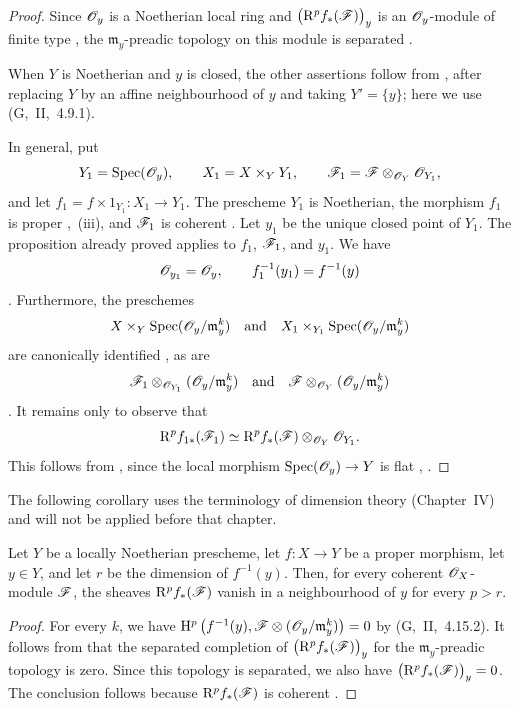 \begin{proof}
Since $\mathscr{O}_y$ is a Noetherian local ring and
$\bigl(\mathrm{R}^p f_*(\mathscr{F})\bigr)_y$ is an $\mathscr{O}_y$-module of finite
type , the $\mathfrak{m}_y$-preadic topology on this
module is separated .

When $Y$ is Noetherian and $y$ is closed, the other assertions follow
from , after replacing $Y$ by an affine neighbourhood
of $y$ and taking $Y'=\{y\}$; here we use (G,~II,~4.9.1).

In general, put
\[
  Y_1=\operatorname{Spec}(\mathscr{O}_y),
  \qquad
  X_1=X\times_Y Y_1,
  \qquad
  \mathscr{F}_1
  =
  \mathscr{F}\otimes_{\mathscr{O}_Y}\mathscr{O}_{Y_1},
\]
and let $f_1=f\times 1_{Y_1}:X_1\longrightarrow Y_1$.
The prescheme $Y_1$ is Noetherian, the morphism $f_1$ is proper
,~(iii), and $\mathscr{F}_1$ is coherent
.
Let $y_1$ be the unique closed point of $Y_1$.
The proposition already proved applies to $f_1$, $\mathscr{F}_1$, and
$y_1$.
We have
\[
  \mathscr{O}_{y_1}=\mathscr{O}_y,
  \qquad
  f_1^{-1}(y_1)=f^{-1}(y)
\]
.
Furthermore, the preschemes
\[
  X\times_Y\operatorname{Spec}(\mathscr{O}_y/\mathfrak{m}_y^k)
  \quad\text{and}\quad
  X_1\times_{Y_1}\operatorname{Spec}(\mathscr{O}_y/\mathfrak{m}_y^k)
\]
are canonically identified , as are
\[
  \mathscr{F}_1
  \otimes_{\mathscr{O}_{Y_1}}
  (\mathscr{O}_y/\mathfrak{m}_y^k)
  \quad\text{and}\quad
  \mathscr{F}
  \otimes_{\mathscr{O}_Y}
  (\mathscr{O}_y/\mathfrak{m}_y^k)
\]
.
It remains only to observe that
\[
  \mathrm{R}^p f_{1*}(\mathscr{F}_1)
  \simeq
  \mathrm{R}^p f_*(\mathscr{F})
  \otimes_{\mathscr{O}_Y}
  \mathscr{O}_{Y_1}.
\]
This follows from , since the local morphism
$\operatorname{Spec}(\mathscr{O}_y)\to Y$ is flat
, .
\end{proof}

The following corollary uses the terminology of dimension theory
(Chapter~IV) and will not be applied before that chapter.

\begin{corollary}[4.2.2]
\label{III.4.2.2}
Let $Y$ be a locally Noetherian prescheme, let $f:X\to Y$ be a
proper morphism, let $y\in Y$, and let $r$ be the dimension of
$f^{-1}(y)$.
Then, for every coherent $\mathscr{O}_X$-module $\mathscr{F}$, the sheaves
$\mathrm{R}^p f_*(\mathscr{F})$ vanish in a neighbourhood of $y$ for every
$p>r$.
\end{corollary}

\begin{proof}
For every $k$, we have $\mathrm{H}^p\left(
f^{-1}(y),
\mathscr{F}\otimes
(\mathscr{O}_y/\mathfrak{m}_y^k)
\right)
=
0$
by (G,~II,~4.15.2).
It follows from  that the separated completion of
$\bigl(\mathrm{R}^p f_*(\mathscr{F})\bigr)_y$ for the
$\mathfrak{m}_y$-preadic topology is zero.
Since this topology is separated, we also have $\bigl(\mathrm{R}^p f_*(\mathscr{F})\bigr)_y=0$.
The conclusion follows because $\mathrm{R}^p f_*(\mathscr{F})$ is coherent
.
\end{proof}

